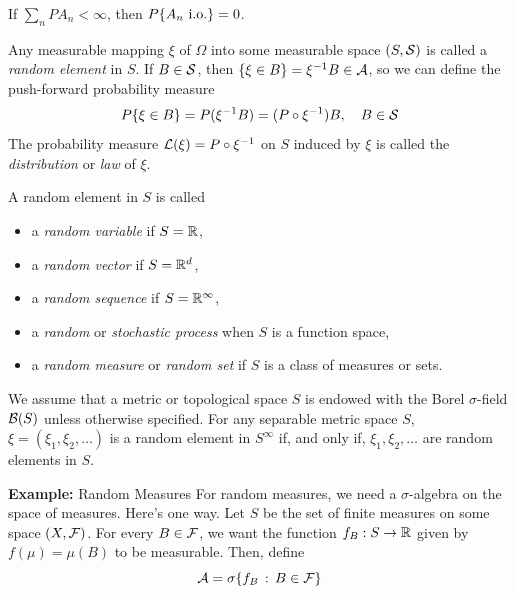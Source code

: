 \begin{lemma}
    If $\sum_{n} PA_n < \infty$, then $P\{A_n \tt{ i.o.}\} = 0$.
\end{lemma}

\begin{definition}
    Any measurable mapping $\xi$ of $\Omega$ into some measurable space $(S, \cal{S})$ is called a \emph{random element} in $S$. If $B \in \cal{S}$, then $\{\xi \in B\} = \xi^{-1}B \in \cal{A}$, so we can define the push-forward probability measure
    \[ P\{\xi \in B\} = P(\xi^{-1}B) = (P \circ \xi^{-1})B, \quad B \in \cal{S} \]
    The probability measure $\cal{L}(\xi) = P \circ \xi^{-1}$ on $S$ induced by $\xi$ is called the \emph{distribution} or \emph{law} of $\xi$.
\end{definition}

\begin{definition}
    A random element in $S$ is called
    \begin{itemize}
        \item a \emph{random variable} if $S = \R$,
        \item a \emph{random vector} if $S = \R^{d}$,
        \item a \emph{random sequence} if $S = \R^{\infty}$,
        \item a \emph{random} or \emph{stochastic process} when $S$ is a function space,
        \item a \emph{random measure} or \emph{random set} if $S$ is a class of measures or sets.
    \end{itemize}
\end{definition}

We assume that a metric or topological space $S$ is endowed with the Borel $\sigma$-field $\cal{B}(S)$ unless otherwise specified. For any separable metric space $S$, $\xi = (\xi_1, \xi_2, \ldots)$ is a random element in $S^{\infty}$ if, and only if, $\xi_1, \xi_2, \ldots$ are random elements in $S$.

\begin{example}{\textbf{Example:} Random Measures}
    For random measures, we need a $\sigma$-algebra on the space of measures. Here's one way. Let $S$ be the set of finite measures on some space $(X, \cal{F})$. For every $B \in \cal{F}$, we want the function $f_{B} : S \to \R$ given by $f(\mu) = \mu(B)$ to be measurable. Then, define
    \[ \cal{A} = \sigma\{f_{B} \col B \in \cal{F}\} \]
\end{example}
